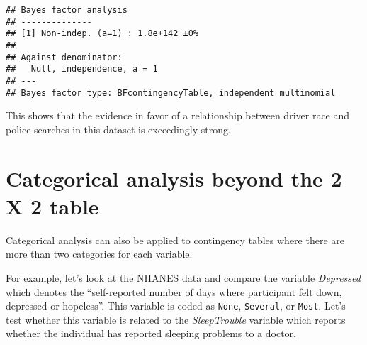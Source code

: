 \documentclass[]{book}
\newenvironment{Shaded}{\begin{snugshade}}{\end{snugshade}}
\newcommand{\KeywordTok}[1]{\textcolor[rgb]{0.13,0.29,0.53}{\textbf{#1}}}
\newcommand{\DataTypeTok}[1]{\textcolor[rgb]{0.13,0.29,0.53}{#1}}
\newcommand{\StringTok}[1]{\textcolor[rgb]{0.31,0.60,0.02}{#1}}
\newcommand{\CommentTok}[1]{\textcolor[rgb]{0.56,0.35,0.01}{\textit{#1}}}
\newcommand{\OperatorTok}[1]{\textcolor[rgb]{0.81,0.36,0.00}{\textbf{#1}}}
\newcommand{\NormalTok}[1]{#1}
\theoremstyle{definition}
\theoremstyle{definition}
\theoremstyle{definition}
\theoremstyle{remark}
\begin{document}
\begin{verbatim}
## Bayes factor analysis
## --------------
## [1] Non-indep. (a=1) : 1.8e+142 ±0%
## 
## Against denominator:
##   Null, independence, a = 1 
## ---
## Bayes factor type: BFcontingencyTable, independent multinomial
\end{verbatim}

This shows that the evidence in favor of a relationship between driver
race and police searches in this dataset is exceedingly strong.

\section{Categorical analysis beyond the 2 X 2
table}\label{categorical-analysis-beyond-the-2-x-2-table}

Categorical analysis can also be applied to contingency tables where
there are more than two categories for each variable.

For example, let's look at the NHANES data and compare the variable
\emph{Depressed} which denotes the ``self-reported number of days where
participant felt down, depressed or hopeless''. This variable is coded
as \texttt{None}, \texttt{Several}, or \texttt{Most}. Let's test whether
this variable is related to the \emph{SleepTrouble} variable which
reports whether the individual has reported sleeping problems to a
doctor.

\begin{Shaded}
\end{Shaded}
\end{document}
